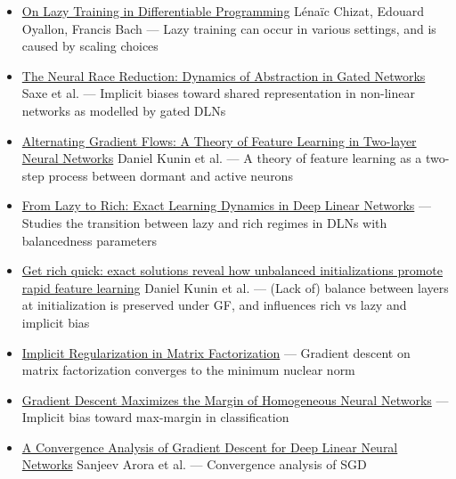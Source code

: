 \documentclass[11pt]{article}
\begin{document}
\begin{itemize}
  \item \href{https://arxiv.org/abs/1812.07956}{On Lazy Training in Differentiable Programming} Lénaïc Chizat, Edouard Oyallon, Francis Bach --- Lazy training can occur in various settings, and is caused by scaling choices
  \item \href{https://arxiv.org/abs/2207.10430}{The Neural Race Reduction: Dynamics of Abstraction in Gated Networks} Saxe et al. --- Implicit biases toward shared representation in non-linear networks as modelled by gated DLNs
  \item \href{https://arxiv.org/abs/2506.06489}{Alternating Gradient Flows: A Theory of Feature Learning in Two-layer Neural Networks} Daniel Kunin et al. --- A theory of feature learning as a two-step process between dormant and active neurons
  \item \href{https://arxiv.org/abs/2409.14623}{From Lazy to Rich: Exact Learning Dynamics in Deep Linear Networks} --- Studies the transition between lazy and rich regimes in DLNs with balancedness parameters
  \item \href{https://arxiv.org/abs/2406.06158}{Get rich quick: exact solutions reveal how unbalanced initializations promote rapid feature learning} Daniel Kunin et al. --- (Lack of) balance between layers at initialization is preserved under GF, and influences rich vs lazy and implicit bias
  \item \href{https://arxiv.org/abs/1705.09280}{Implicit Regularization in Matrix Factorization} --- Gradient descent on matrix factorization converges to the minimum nuclear norm
  \item \href{https://arxiv.org/abs/1906.05890}{Gradient Descent Maximizes the Margin of Homogeneous Neural Networks} --- Implicit bias toward max-margin in classification
  \item \href{https://arxiv.org/abs/1810.02281}{A Convergence Analysis of Gradient Descent for Deep Linear Neural Networks} Sanjeev Arora et al. --- Convergence analysis of SGD
\end{itemize}
\end{document}
